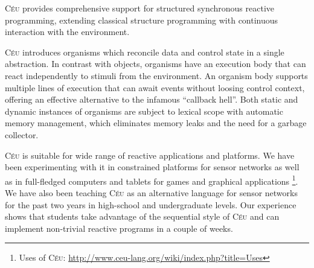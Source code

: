 \documentclass[preprint]{sigplanconf}
\newcommand{\CEU}{\textsc{C\'{e}u}\xspace}
\newcommand{\1}{\;}
\newcommand{\2}{\;\;}
\newcommand{\3}{\;\;\;}
\newcommand{\5}{\;\;\;\;\;}
\newcommand{\URL}{\small\url}
\begin{document}

\CEU provides comprehensive support for structured synchronous reactive 
programming, extending classical structure programming with continuous 
interaction with the environment.

\CEU introduces organisms which reconcile data and control state in a single 
abstraction.
%
In contrast with objects, organisms have an execution body that can react 
independently to stimuli from the environment.
An organism body supports multiple lines of execution that can await events 
without loosing control context, offering an effective alternative to the 
infamous ``callback hell''.
%
Both static and dynamic instances of organisms are subject to lexical scope 
with automatic memory management, which eliminates memory leaks and the need 
for a garbage collector.

\CEU is suitable for wide range of reactive applications and platforms.
%
We have been experimenting with it in constrained platforms for sensor networks 
as well as in full-fledged computers and tablets for games and graphical 
applications%
\footnote{Uses of \CEU: \URL{http://www.ceu-lang.org/wiki/index.php?title=Uses}}.
%
%
We have also been teaching \CEU as an alternative language for sensor networks 
for the past two years in high-school and undergraduate levels.
%
Our experience shows that students take advantage of the sequential style of 
\CEU and can implement non-trivial reactive programs in a couple of weeks.
\end{document}
